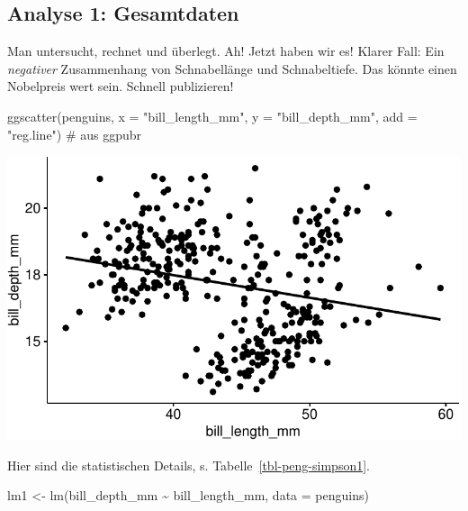 \documentclass[
  letterpaper,
]{scrbook}
\newenvironment{Shaded}{\begin{snugshade}}{\end{snugshade}}
\newcommand{\AttributeTok}[1]{\textcolor[rgb]{0.40,0.45,0.13}{#1}}
\newcommand{\CommentTok}[1]{\textcolor[rgb]{0.37,0.37,0.37}{#1}}
\newcommand{\FunctionTok}[1]{\textcolor[rgb]{0.28,0.35,0.67}{#1}}
\newcommand{\NormalTok}[1]{\textcolor[rgb]{0.00,0.23,0.31}{#1}}
\newcommand{\OtherTok}[1]{\textcolor[rgb]{0.00,0.23,0.31}{#1}}
\newcommand{\SpecialCharTok}[1]{\textcolor[rgb]{0.37,0.37,0.37}{#1}}
\newcommand{\StringTok}[1]{\textcolor[rgb]{0.13,0.47,0.30}{#1}}
\theoremstyle{definition}
\theoremstyle{definition}
\theoremstyle{definition}
\theoremstyle{remark}
\begin{document}
\subsection{Analyse 1: Gesamtdaten}\label{analyse-1-gesamtdaten}

Man untersucht, rechnet und überlegt. Ah! Jetzt haben wir es! Klarer
Fall: Ein \emph{negativer} Zusammenhang von Schnabellänge und
Schnabeltiefe. Das könnte einen Nobelpreis wert sein. Schnell
publizieren!

\begin{Shaded}
\begin{Highlighting}[]
\FunctionTok{ggscatter}\NormalTok{(penguins, }\AttributeTok{x =} \StringTok{"bill\_length\_mm"}\NormalTok{, }\AttributeTok{y =} \StringTok{"bill\_depth\_mm"}\NormalTok{, }
          \AttributeTok{add =} \StringTok{"reg.line"}\NormalTok{)  }\CommentTok{\# aus \textasciigrave{}ggpubr\textasciigrave{}}
\end{Highlighting}
\end{Shaded}

\begin{center}
\includegraphics[width=0.7\linewidth,height=\textheight,keepaspectratio]{090-regression2_files/figure-pdf/unnamed-chunk-62-1.pdf}
\end{center}

Hier sind die statistischen Details, s. Tabelle~\ref{tbl-peng-simpson1}.

\begin{Shaded}
\begin{Highlighting}[]
\NormalTok{lm1 }\OtherTok{\textless{}{-}} \FunctionTok{lm}\NormalTok{(bill\_depth\_mm }\SpecialCharTok{\textasciitilde{}}\NormalTok{ bill\_length\_mm, }\AttributeTok{data =}\NormalTok{ penguins)}
\end{Highlighting}
\end{Shaded}
\end{document}
